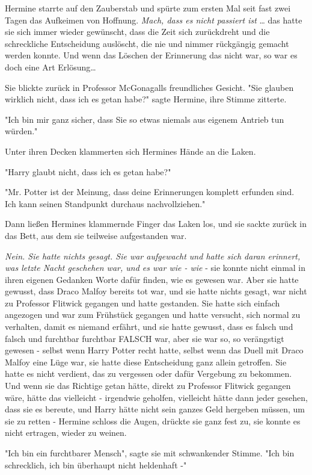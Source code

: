 {Hermine starrte auf den Zauberstab und spürte zum ersten Mal seit fast zwei Tagen das Aufkeimen von Hoffnung. \emph{Mach, dass es nicht passiert ist} … das hatte sie sich immer wieder gewünscht, dass die Zeit sich zurückdreht und die schreckliche Entscheidung auslöscht, die nie und nimmer rückgängig gemacht werden konnte. Und wenn das Löschen der Erinnerung das nicht war, so war es doch eine Art Erlösung…

Sie blickte zurück in Professor McGonagalls freundliches Gesicht. "Sie glauben wirklich nicht, dass ich es getan habe?" sagte Hermine, ihre Stimme zitterte.

"Ich bin mir ganz sicher, dass Sie so etwas niemals aus eigenem Antrieb tun würden."

Unter ihren Decken klammerten sich Hermines Hände an die Laken.

"Harry glaubt nicht, dass ich es getan habe?"

"Mr. Potter ist der Meinung, dass deine Erinnerungen komplett erfunden sind. Ich kann seinen Standpunkt durchaus nachvollziehen."

Dann ließen Hermines klammernde Finger das Laken los, und sie sackte zurück in das Bett, aus dem sie teilweise aufgestanden war.

\emph{Nein. Sie hatte nichts gesagt. Sie war aufgewacht und hatte sich daran erinnert, was letzte Nacht geschehen war, und es war wie - wie} - sie konnte nicht einmal in ihren eigenen Gedanken Worte dafür finden, wie es gewesen war. Aber sie hatte gewusst, dass Draco Malfoy bereits tot war, und sie hatte nichts gesagt, war nicht zu Professor Flitwick gegangen und hatte gestanden. Sie hatte sich einfach angezogen und war zum Frühstück gegangen und hatte versucht, sich normal zu verhalten, damit es niemand erfährt, und sie hatte gewusst, dass es falsch und falsch und furchtbar furchtbar FALSCH war, aber sie war so, so verängstigt gewesen - selbst wenn Harry Potter recht hatte, selbst wenn das Duell mit Draco Malfoy eine Lüge war, sie hatte diese Entscheidung ganz allein getroffen. Sie hatte es nicht verdient, das zu vergessen oder dafür Vergebung zu bekommen. Und wenn sie das Richtige getan hätte, direkt zu Professor Flitwick gegangen wäre, hätte das vielleicht - irgendwie geholfen, vielleicht hätte dann jeder gesehen, dass sie es bereute, und Harry hätte nicht sein ganzes Geld hergeben müssen, um sie zu retten - Hermine schloss die Augen, drückte sie ganz fest zu, sie konnte es nicht ertragen, wieder zu weinen.

"Ich bin ein furchtbarer Mensch", sagte sie mit schwankender Stimme. "Ich bin schrecklich, ich bin überhaupt nicht heldenhaft -"

}
